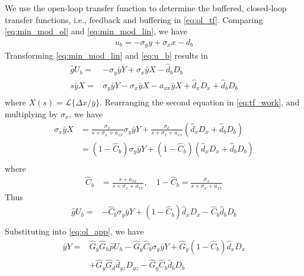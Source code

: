 \documentclass[letterpaper, 10 pt,  conference]{ieeeconf}  %
\begin{document}
We use the open-loop transfer function to determine the buffered, closed-loop transfer functions, i.e., feedback and buffering in \eqref{eq:ol_tf}. Comparing 
\eqref{eq:min_mod_ol} and \eqref{eq:min_mod_lin}, we have
\begin{equation}\label{eq:u_b}
\begin{aligned}
u_b=-\sigma_yy+\sigma_xx-d_b
\end{aligned}
\end{equation}
Transforming \eqref{eq:min_mod_lin} and \eqref{eq:u_b} results in
\begin{equation}\label{eq:tf_work}
\begin{aligned}
\hat{g}U_b=&-\sigma_y\bar{y}Y+\sigma_x\bar{y}X-\hat d_bD_b\\
s\bar{y}X=&\sigma_y\bar{y}Y-\sigma_x\bar{y}X-a_{xx}\bar{y}X+\hat d_x D_x+\hat d_bD_b\\
\end{aligned}
\end{equation}
where $X(s)=\mathcal{L}\{\Delta x/\bar{y}\}$.
Rearranging the second equation in \eqref{eq:tf_work}, and multiplying by $\sigma_x$, we have
\begin{equation*}
\begin{aligned}
\sigma_x \bar{y}X&=\frac{\sigma_x}{s+\sigma_x+a_{xx}}\sigma_y\bar{y}Y+\frac{\sigma_x}{s+\sigma_x+a_{xx}}(\hat d_xD_x+\hat d_bD_b)\\
&=(1-\hat{C}_b)\sigma_y\bar{y}Y+(1-\hat{C}_b)(\hat d_xD_x+\hat d_bD_b)\\
\end{aligned}
\end{equation*}
where
\begin{equation*}
\begin{aligned}
\hat{C}_b&=\frac{s+a_{xx}}{s+\sigma_x+a_{xx}},\quad 1-\hat{C}_b=\frac{\sigma_x}{s+\sigma_x+a_{xx}}
\end{aligned}
\end{equation*}
Thus 
\begin{equation*}
\begin{aligned}
\hat{g}U_b=&-\hat{C}_b\sigma_y\bar{y}Y+(1-\hat{C}_b)\hat d_xD_x -\hat{C}_b\hat d_bD_b\\
\end{aligned}
\end{equation*}
Substituting into \eqref{eq:ol_app}, we have
\begin{equation*}
\begin{aligned}
\bar{y}Y=&\hat G_y\hat G_h\hat{p}U_h-\hat G_y\hat{C}_b\sigma_y \bar{y}Y+\hat G_y(1-\hat{C}_b)\hat d_xD_x\\
&+\hat G_y\hat G_d\hat d_{yz}D_{yz}-\hat G_y\hat{C}_b\hat d_bD_b\\
\end{aligned}
\end{equation*}
\end{document}
